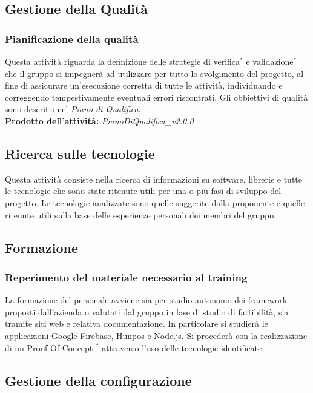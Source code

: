 \documentclass[11pt,a4paper]{article}
\begin{document}
{	\subsection{Gestione della Qualità}
	\subsubsection{Pianificazione della qualità}
	Questa attività riguarda la definizione delle strategie di verifica$^*$ e validazione$^*$ che il gruppo si impegnerà ad utilizzare per tutto lo svolgimento del progetto, al fine di assicurare un'esecuzione corretta di tutte le attività, individuando e correggendo tempestivamente eventuali errori riscontrati. Gli obbiettivi di qualità sono descritti nel \textit{Piano di Qualifica}.\\
	\textbf{Prodotto dell'attività:} \textit{PianoDiQualifica\_v2.0.0}
	
	\subsection{Ricerca sulle tecnologie} 
	Questa attività consiste nella ricerca di informazioni su software, librerie e tutte le tecnologie che sono state ritenute utili per una o più fasi di sviluppo del progetto. Le tecnologie analizzate  sono quelle suggerite dalla proponente e quelle ritenute utili sulla base delle esperienze personali dei membri del gruppo.
	
	\subsection{Formazione}
	\subsubsection{Reperimento del materiale necessario al training}
	La formazione del personale avviene sia per studio autonomo dei framework proposti dall’azienda o valutati dal gruppo in fase di studio di fattibilità, sia tramite siti web e relativa documentazione. In particolare si studierà le applicazioni Google Firebase, Hunpos e Node.js. Si procederà con la realizzazione di un Proof Of Concept $^*$ attraverso l’uso delle tecnologie identificate.
	\\
\subsection{Gestione della configurazione}
}
\end{document}
